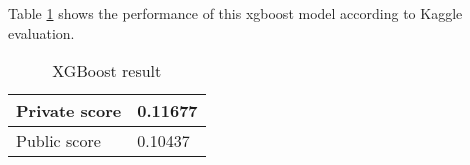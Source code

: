Table \ref{tab:xgboost_result} shows the performance of this xgboost model according to Kaggle evaluation. 
\begin{table}[h]
	\centering
	\caption{XGBoost result}
	\label{tab:xgboost_result}
	\begin{tabular}{|m{100pt}|m{50pt}|}
		\hline
		Private score & 0.11677 \\ \hline
		Public score  & 0.10437 \\ \hline
	\end{tabular}
\end{table}	